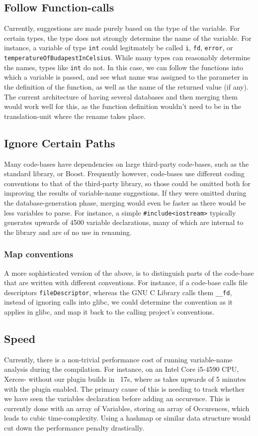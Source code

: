 \subsection{Follow Function-calls}
Currently, suggestions are made purely based on the type of the variable. For
certain types, the type does not strongly determine the name of the variable.
For instance, a variable of type \lstinline|int| could legitmately be called
\lstinline|i|, \lstinline|fd|, \lstinline|error|, or
\lstinline|temperatureOfBudapestInCelsius|. While many types can reasonably
determine the names, types like \lstinline|int| do not. In this case, we can
follow the functions into which a variable is passed, and see what name was
assigned to the parameter in the definition of the function, as well as the name
of the returned value (if any). The current architecture of having several
databases and then merging them would work well for this, as the function
definition wouldn't need to be in the translation-unit where the rename takes
place.

\subsection{Ignore Certain Paths}
Many code-bases have dependencies on large third-party code-bases, such as the
\CC{} standard library, or Boost. Frequently however, code-bases use different
coding conventions to that of the third-party library, so those could be omitted
both for improving the results of variable-name suggestions. If they were
omitted during the database-generation phase, merging would even be faster as
there would be less variables to parse. For instance, a simple
\lstinline|#include<iostream>| typically generates upwards of 4500 variable
declarations, many of which are internal to the library and are of no use in
renaming.

\subsubsection{Map conventions}
A more sophisticated version of the above, is to distinguish parts of the
code-base that are written with different conventions. For instance, if a
code-base calls file descriptors \lstinline|fileDescriptor|, whereas the GNU C
Library \cite{glibc} calls them \lstinline|__fd|, instead of ignoring calls into
glibc, we could determine the convention as it applies in glibc, and map it back
to the calling project's conventions.

\subsection{Speed}
Currently, there is a non-trivial performance cost of running variable-name
analysis during the compilation. For instance, on an Intel Core i5-4590 CPU,
Xerces-\CC{} without our plugin builds in ~17s, where as takes upwards of 5
minutes with the plugin enabled. The primary cause of this is needing to track
whether we have seen the variables declaration before adding an occurence. This
is currently done with an array of Variables, storing an array of Occurences,
which leads to cubic time-complexity. Using a hashmap or similar data structure
would cut down the performance penalty drastically.
